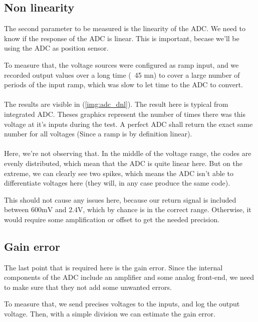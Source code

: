 \FloatBarrier
\subsection{Non linearity}
The second parameter to be measured is the linearity of the ADC. We need to know if the response of
the ADC is linear. This is important, becase we'll be using the ADC as position sensor.

To measure that, the voltage sources were configured as ramp input, and we recorded output values over
a long time (~45 mn) to cover a large number of periods of the input ramp, which was slow to let time
to the ADC to convert.

\paragraph{}
The results are visible in (\ref{img:adc_dnl}).
The result here is typical from integrated ADC. Theses graphics represent the number of times there was this
voltage at it's inputs during the test.
A perfect ADC shall return the exact same number for all voltages (Since a ramp is by definition linear).

\paragraph{}
Here, we're not observing that. In the middle of the voltage range, the codes are evenly distributed, which
mean that the ADC is quite linear here. But on the extreme, we can clearly see two spikes, which means the ADC
isn't able to differentiate voltages here (they will, in any case produce the same code).

This should not cause any issues here, because our return signal is included between $600 \si{\milli\volt}$
and $2.4 \si{\volt}$, which by chance is in the correct range. Otherwise, it would require some amplification
or offset to get the needed precision.

\FloatBarrier
\subsection{Gain error}
The last point that is required here is the gain error. Since the internal components of the ADC include
an amplifier and some analog front-end, we need to make sure that they not add some unwanted errors.

To measure that, we send precises voltages to the inputs, and log the output voltage.
Then, with a simple division we can estimate the gain error.

